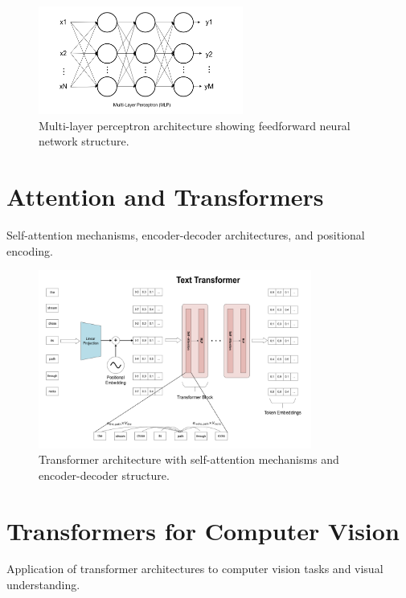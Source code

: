 \begin{figure}[htbp]
\centering
\includegraphics[width=0.6\textwidth]{Images/mlp.png}
\caption{Multi-layer perceptron architecture showing feedforward neural network structure.}
\label{fig:mlp}
\end{figure}

\section{Attention and Transformers}

Self-attention mechanisms, encoder-decoder architectures, and positional encoding.

\begin{figure}[htbp]
\centering
\includegraphics[width=0.8\textwidth]{Images/transformer.png}
\caption{Transformer architecture with self-attention mechanisms and encoder-decoder structure.}
\label{fig:transformer}
\end{figure}

\section{Transformers for Computer Vision}

Application of transformer architectures to computer vision tasks and visual understanding.

